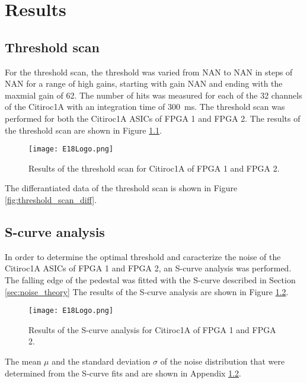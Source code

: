 \chapter{Results}\label{cha:results}
\section{Threshold scan}
For the threshold scan, the threshold was varied from NAN to NAN in steps of NAN for a range of high gains,
starting with gain NAN and ending with the maxmial gain of 62.
\newline
The number of hits was measured for each of the 32 channels of the Citiroc1A with an integration time of \SI{300}{\milli\second}.
\newline
The threshold scan was performed for both the Citiroc1A ASICs of FPGA 1 and FPGA 2.
\newline
The results of the threshold scan are shown in Figure \ref{fig:threshold_scan}.
\begin{figure}[H]
    \centering
    \texttt{[image: E18Logo.png]}
    \caption{Results of the threshold scan for Citiroc1A of FPGA 1 and FPGA 2.}
    \label{fig:threshold_scan}
\end{figure}
The differantiated data of the threshold scan is shown in Figure \ref{fig:threshold_scan_diff}.


\section{S-curve analysis}
In order to determine the optimal threshold and caracterize the noise of the Citiroc1A ASICs of FPGA 1 and FPGA 2, an S-curve analysis was performed.
\newline
The falling edge of the pedestal was fitted with the S-curve described in Section \ref{sec:noise_theory}
\newline
The results of the S-curve analysis are shown in Figure \ref{fig:S_curve}.
\begin{figure}[H]
    \centering
    \texttt{[image: E18Logo.png]}
    \caption{Results of the S-curve analysis for Citiroc1A of FPGA 1 and FPGA 2.}
    \label{fig:S_curve}
\end{figure}
The mean $\mu$ and the standard deviation $\sigma$ of the noise distribution that were determined from the S-curve fits and are shown in Appendix \ref{}.



